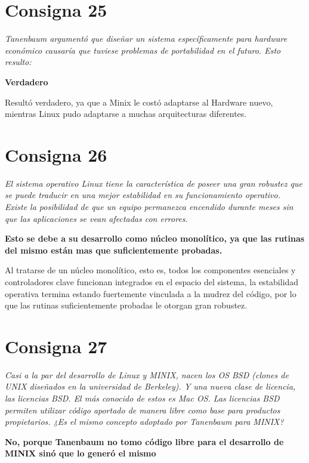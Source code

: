 \documentclass[11pt]{article}
\begin{document}
\section*{Consigna 25}

\emph{
    Tanenbaum argumentó que diseñar un sistema específicamente para hardware
    económico causaría que tuviese problemas de portabilidad en el futuro. Esto
    resulto:
}

\textbf{
    Verdadero
}

Resultó verdadero, ya que a Minix le costó adaptarse al Hardware nuevo, mientras 
Linux pudo adaptarse a muchas arquitecturas diferentes. 

\section*{Consigna 26}

\emph{
    El sistema operativo Linux tiene la característica de poseer una gran
    robustez que se puede traducir en una mejor estabilidad en su funcionamiento
    operativo. Existe la posibilidad de que un equipo permanezca encendido
    durante meses sin que las aplicaciones se vean afectadas con errores.
}

\textbf{
    Esto se debe a su desarrollo como núcleo monolítico, ya que las rutinas del
    mismo están mas que suficientemente probadas.
}

Al tratarse de un núcleo monolítico, esto es, todos los componentes esenciales 
y controladores clave funcionan integrados en el espacio del sistema, la 
estabilidad operativa termina estando fuertemente vinculada a la mudrez del
código, por lo que las rutinas suficientemente probadas le otorgan gran
robustez.

\section{Consigna 27}

\emph{
    Casi a la par del desarrollo de Linux y MINIX, nacen los OS BSD (clones de
    UNIX diseñados en la universidad de Berkeley). Y una nueva clase de
    licencia, las licencias BSD. El más conocido de estos es Mac OS. Las
    licencias BSD permiten utilizar código aportado de manera libre como base
    para productos propietarios.  ¿Es el mismo concepto adoptado por Tanenbaum
    para MINIX?
}

\textbf{
No, porque Tanenbaum no tomo código libre para el desarrollo de MINIX sinó que
lo generó el mismo
}
\end{document}
